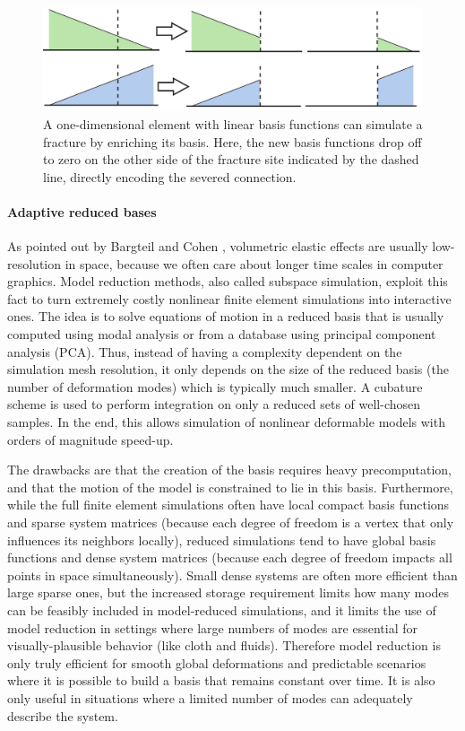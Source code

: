 \begin{figure}[t]
\centering
\includegraphics[width=0.8\linewidth]{images/starAdaptivity-cgf2016/xfem.png}
\caption[STAR adaptivity: XFEM illustration]{\label{fig:basisenrichment}
A one-dimensional element with linear basis functions can simulate a fracture by enriching its basis. Here, the new basis functions drop off to zero on the other side of the fracture site indicated by the dashed line, directly encoding the severed connection.
}
\end{figure}

\paragraph*{Adaptive reduced bases}
As pointed out by Bargteil and Cohen \cite{bargteil2014animation}, volumetric elastic effects are usually low-resolution in space, because we often care about longer time scales in computer graphics.
Model reduction methods, also called subspace simulation, exploit this fact to turn extremely costly nonlinear finite element simulations into interactive ones.
The idea is to solve equations of motion in a reduced basis that is usually computed using modal analysis or from a database using principal component analysis (PCA).
Thus, instead of having a complexity dependent on the simulation mesh resolution, it only depends on the size of the reduced basis (the number of deformation modes) which is typically much smaller.
A cubature scheme is used to perform integration on only a reduced sets of well-chosen samples. In the end, this allows simulation of nonlinear deformable models with orders of magnitude speed-up.

The drawbacks are that the creation of the basis requires heavy precomputation, and that the motion of the model is constrained to lie in this basis. Furthermore, while the full finite element simulations often have local compact basis functions and sparse system matrices (because each degree of freedom is a vertex that only influences its neighbors locally), reduced simulations tend to have global basis functions and dense system matrices (because each degree of freedom impacts all points in space simultaneously). Small dense systems are often more efficient than large sparse ones, but the increased storage requirement limits how many modes can be feasibly included in model-reduced simulations, and it limits the use of model reduction in settings where large numbers of modes are essential for visually-plausible behavior (like cloth and fluids).
Therefore model reduction is only truly efficient for smooth global deformations and predictable scenarios where it is possible to build a basis that remains constant over time. It is also only useful in situations where a limited number of modes can adequately describe the system.

